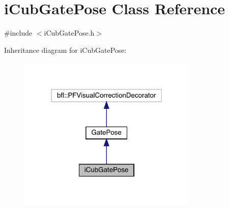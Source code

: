 \hypertarget{classiCubGatePose}{}\section{i\+Cub\+Gate\+Pose Class Reference}
\label{classiCubGatePose}


{\ttfamily \#include $<$i\+Cub\+Gate\+Pose.\+h$>$}



Inheritance diagram for i\+Cub\+Gate\+Pose\+:
\nopagebreak
\begin{figure}[H]
\begin{center}
\leavevmode
\includegraphics[width=242pt]{classiCubGatePose__inherit__graph}
\end{center}
\end{figure}
